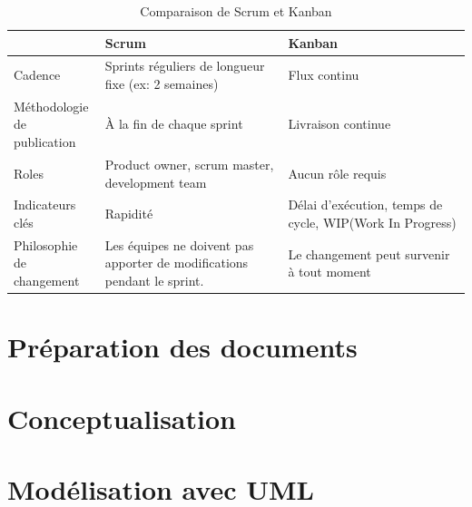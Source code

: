         \par    
\begin{table}
        \centering
        \begin{tabular}{|p{0.20\linewidth}|p{0.40\linewidth}|p{0.40\linewidth}|}
        \hline
                \textbf{} & \textbf{Scrum}& \textbf{Kanban}  \\
                \hline
                Cadence &
                Sprints réguliers de longueur fixe (ex: 2 semaines)&
                Flux continu
                \\
                \hline
                Méthodologie de publication&
                À la fin de chaque sprint&
                Livraison continue
                    \\
                \hline
                Roles &
                Product owner, scrum master, development team&
                Aucun rôle requis
                    \\
                \hline
                Indicateurs clés&
                Rapidité&
                Délai d'exécution, temps de cycle, WIP(Work In Progress)
                    \\
                \hline
                Philosophie de changement&
                Les équipes ne doivent pas apporter de modifications pendant le sprint.&
                Le changement peut survenir à tout moment
                        \\

                \hline 
        \end{tabular}
        \caption{Comparaison de Scrum et Kanban} \label{tab:scrumvskanban}
\end{table}
\par
        
        
        \section{Préparation des documents}
                
        \section{Conceptualisation}
                
        \section{Modélisation avec UML}
                
